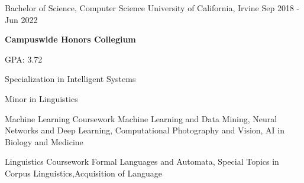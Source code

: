 
\begin{cventries}
  \cventry
    {Bachelor of Science, Computer Science} %
    {University of California, Irvine} %
    {} %
    {Sep 2018 - Jun 2022} %
    {
      \begin {cvitems}
        \item{\textbf{Campuswide Honors Collegium}}
        \item{GPA: 3.72}
        \item{Specialization in Intelligent Systems}
        \item{Minor in Linguistics}
      \end{cvitems}
    }
\end{cventries}

\begin{cvskills}
  \cvskill
    {Machine Learning Coursework}
    {Machine Learning and Data Mining, Neural Networks and Deep Learning, \newline Computational Photography and Vision, AI in Biology and Medicine}

  \cvskill
    {Linguistics Coursework}
    {Formal Languages and Automata, Special Topics in Corpus Linguistics,\newline Acquisition of Language}
  
\end{cvskills}
